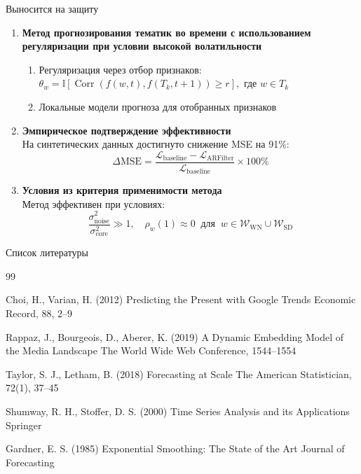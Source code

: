 \documentclass{beamer}
\begin{document}
\begin{frame}{Выносится на защиту}
\begin{enumerate}
    \item \textbf{Метод прогнозирования тематик во времени с использованием регуляризации при условии высокой волатильности}\\
    \begin{enumerate}
        \item Регуляризация через отбор признаков: \(\theta_w=\mathbb{I}[\operatorname{Corr}(f(w,t),f(T_k,t+1))\ge r], \text{ где } w \in T_k\)
        \item Локальные модели прогноза для отобранных признаков
    \end{enumerate}

    \item \textbf{Эмпирическое подтверждение эффективности}\\
    На синтетических данных достигнуто снижение MSE на 91\%:
    \[
        \Delta\mathrm{MSE} = \frac{\mathcal L_{\mathrm{baseline}}-\mathcal L_{\mathrm{ARFilter}}}{\mathcal L_{\mathrm{baseline}}}\times100\%
    \]

    \item \textbf{Условия из критерия применимости метода}\\
    Метод эффективен при условиях:
    \[
        \frac{\sigma_{\mathrm{noise}}^{2}}{\sigma_{\mathrm{core}}^{2}} \gg 1, \quad
        \rho_{w}(1)\approx0 \;\;\text{для}\;\; w\in\mathcal{W}_{\mathrm{WN}}\cup\mathcal{W}_{\mathrm{SD}}
    \]
\end{enumerate}
\end{frame}

\begin{frame}{Список литературы}
\begin{thebibliography}{99} 
    \footnotesize
    
        Choi, H., Varian, H. (2012)
        \newblock Predicting the Present with Google Trends
        \newblock Economic Record, 88, 2--9

        Rappaz, J., Bourgeois, D., Aberer, K. (2019)
        \newblock A Dynamic Embedding Model of the Media Landscape
        \newblock The World Wide Web Conference, 1544--1554

        Taylor, S. J., Letham, B. (2018)
        \newblock Forecasting at Scale
        \newblock The American Statistician, 72(1), 37--45

        Shumway, R. H., Stoffer, D. S. (2000)
        \newblock Time Series Analysis and its Applications
        \newblock Springer

        Gardner, E. S. (1985)
        \newblock Exponential Smoothing: The State of the Art
        \newblock Journal of Forecasting

\end{thebibliography}
\end{frame}
\end{document}
